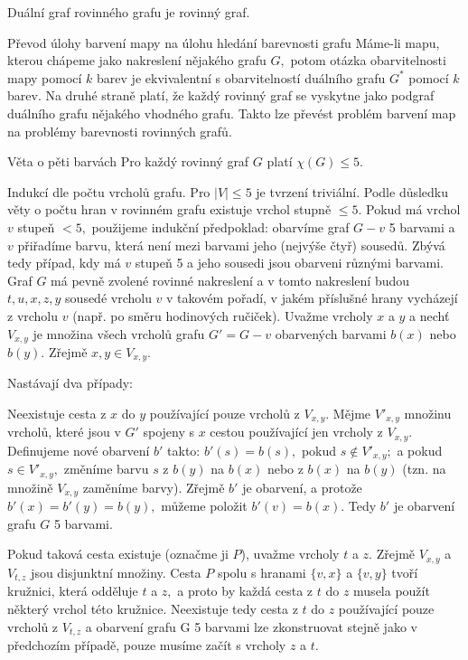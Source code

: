 \begin{lemma}
Duální graf rovinného grafu je rovinný graf.
\end{lemma}

\begin{obecne}{Převod úlohy barvení mapy na úlohu hledání barevnosti grafu}
Máme-li mapu, kterou chápeme jako nakreslení nějakého grafu $G,$ potom otázka obarvitelnosti mapy pomocí $k$ barev je ekvivalentní s obarvitelností duálního grafu $G^*$ pomocí $k$ barev. Na druhé straně platí, že každý rovinný graf se vyskytne jako podgraf duálního grafu nějakého vhodného grafu. Takto lze převést problém barvení map na problémy barevnosti rovinných grafů.
\end{obecne}

\begin{vetaN}{Věta o pěti barvách}
Pro každý rovinný graf $G$ platí $\chi(G)\leq 5.$

\medskip
\begin{dukaz}
Indukcí dle počtu vrcholů grafu. Pro $|V|\leq 5$ je tvrzení triviální. Podle důsledku věty o počtu hran v rovinném grafu existuje vrchol stupně $\leq 5.$ Pokud má vrchol $v$ stupeň $< 5,$ použijeme indukční předpoklad: obarvíme graf $G-v$ 5 barvami a $v$ přiřadíme barvu, která není mezi barvami jeho (nejvýše čtyř) sousedů. Zbývá tedy případ, kdy má $v$ stupeň 5 a jeho sousedi jsou obarveni různými barvami. Graf $G$ má pevně zvolené rovinné nakreslení a v tomto nakreslení budou $t,u,x,z,y$ sousedé vrcholu $v$ v takovém pořadí, v jakém příslušné hrany vycházejí z vrcholu $v$ (např. po směru hodinových ručiček). Uvažme vrcholy $x$ a $y$ a nechť $V_{x,y}$ je množina všech vrcholů grafu $G'=G-v$ obarvených barvami $b(x)$ nebo $b(y).$ Zřejmě $x,y \in V_{x,y}.$

\medskip \noindent Nastávají dva případy:
\begin{penumerate}
\item Neexistuje cesta z $x$ do $y$ používající pouze vrcholů z $V_{x,y}.$
Mějme $V'_{x,y}$ množinu vrcholů, které jsou v $G'$ spojeny s $x$ cestou
používající jen vrcholy z $V_{x,y}.$ Definujeme nové obarvení $b'$ takto:
$b'(s) = b(s),$ pokud $s \not \in V'_{x,y};$ a pokud $s \in V'_{x,y},$
změníme barvu $s$ z $b(y)$ na $b(x)$ nebo z $b(x)$ na $b(y)$ (tzn. na
množině $V_{x,y}$ zaměníme barvy). Zřejmě $b'$ je obarvení, a protože
$b'(x)=b'(y)=b(y),$ můžeme položit $b'(v)=b(x).$ Tedy $b'$ je obarvení
grafu $G$ 5 barvami.
\item Pokud taková cesta existuje (označme ji $P$), uvažme vrcholy $t$ a $z.$
Zřejmě $V_{x,y}$ a $V_{t,z}$ jsou disjunktní množiny. Cesta $P$ spolu
s hranami $\{v,x\}$ a $\{v,y\}$ tvoří kružnici, která odděluje $t$ a
$z,$ a proto by každá cesta z $t$ do $z$ musela použít některý vrchol této
kružnice. Neexistuje tedy cesta z $t$ do $z$ používající pouze vrcholů z
$V_{t,z}$ a obarvení grafu G 5 barvami lze zkonstruovat stejně jako v
předchozím případě, pouze musíme začít s vrcholy $z$ a $t.$
\end{penumerate}
\end{dukaz}
\end{vetaN}

